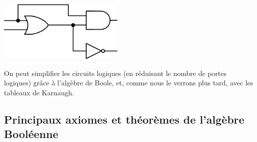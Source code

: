 \documentclass[11pt,a4paper]{article}
\begin{document}
\begin{table}[!ht]
  \centering
  \begin{minipage}{0.45\textwidth}
    \centering

    \includegraphics[width=0.45\textwidth]{img/portes_logiques/autres/connexions_autorisees_CORRECTION.png}

  \end{minipage}
  \hfillx
  \begin{minipage}{0.45\textwidth}
    \centering




  \end{minipage}
\end{table}

On peut simplifier les circuits logiques (en réduisant le nombre de portes logiques) grâce à l'algèbre de Boole, et, comme nous le verrons plus tard, avec les tableaux de Karnaugh.

\medskip


\subsection{Principaux axiomes et théorèmes de l'algèbre Booléenne}
\end{document}
